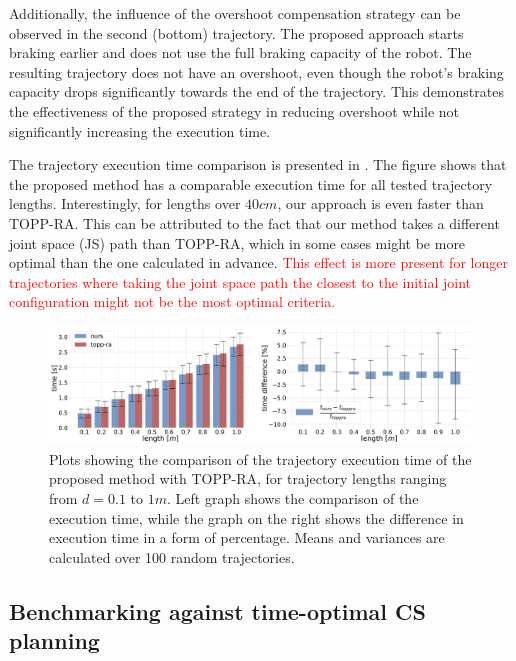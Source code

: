 Additionally, the influence of the overshoot compensation strategy can be observed in the second (bottom) trajectory. The proposed approach starts braking earlier and does not use the full braking capacity of the robot. The resulting trajectory does not have an overshoot, even though the robot's braking capacity drops significantly towards the end of the trajectory. This demonstrates the effectiveness of the proposed strategy in reducing overshoot while not significantly increasing the execution time.

The trajectory execution time comparison is presented in . The figure shows that the proposed method has a comparable execution time for all tested trajectory lengths. Interestingly, for lengths over $40cm$, our approach is even faster than TOPP-RA. This can be attributed to the fact that our method takes a different joint space (JS) path than TOPP-RA, which in some cases might be more optimal than the one calculated in advance. 
\textcolor{red}{This effect is more present for longer trajectories where taking the joint space path the closest to the initial joint configuration might not be the most optimal criteria. }



\begin{figure}[!t]
    \centering
    \includegraphics[width=\linewidth]{Papers/imgs/toppra_ruckig_time_comp.pdf}
    \caption{Plots showing the comparison of the trajectory execution time of the proposed method with TOPP-RA, for trajectory lengths ranging from $d=0.1$ to $1m$. Left graph shows the comparison of the execution time, while the graph on the right shows the difference in execution time in a form of percentage. Means and variances are calculated over 100 random trajectories.}
    \label{fig:comparison_time}
\end{figure}
\subsection{Benchmarking against time-optimal  CS planning}



